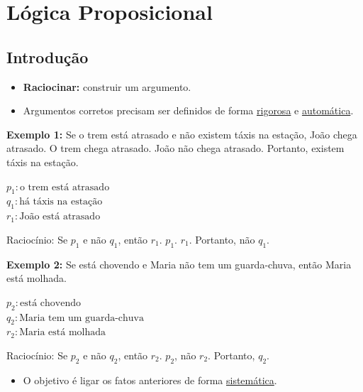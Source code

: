 \section{Lógica Proposicional}
    
    \subsection{Introdução}
        
        \begin{itemize}[left=0.5cm, align=left, nosep]
            \item \textbf{Raciocinar:} construir um argumento.
            \item Argumentos corretos precisam ser definidos de forma \underline{rigorosa} e \underline{automática}.
        \end{itemize}

        \textbf{Exemplo 1:} Se o trem está atrasado e não existem táxis na estação, João chega atrasado.  
        O trem chega atrasado. João não chega atrasado. Portanto, existem táxis na estação.

        $p_1: \text{o trem está atrasado}$ \\ 
        $q_1: \text{há táxis na estação}$ \\
        $r_1: \text{João está atrasado}$
    
        Raciocínio: Se \(p_1\) e não \(q_1\), então \(r_1\). \(p_1\). \(r_1\). Portanto, não \(q_1\).

        \textbf{Exemplo 2:} Se está chovendo e Maria não tem um guarda-chuva, então Maria está molhada.

        $p_2: \text{está chovendo}$ \\
        $q_2: \text{Maria tem um guarda-chuva}$ \\
        $r_2: \text{Maria está molhada}$
        
        Raciocínio: Se \(p_2\) e não \(q_2\), então \(r_2\). \(p_2\), não \(r_2\). Portanto, \(q_2\).
        \begin{itemize}[left=0.5cm, nosep, label=$\hookrightarrow$]
            \item O objetivo é ligar os fatos anteriores de forma \underline{sistemática}.
        \end{itemize}

